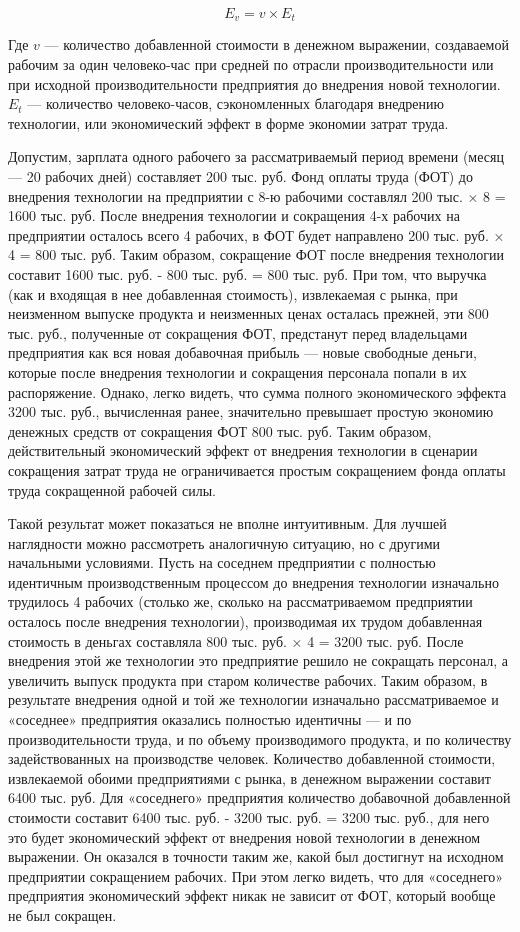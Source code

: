 \documentclass{article}
\begin{document}
$$E_v = v \times E_t$$

Где $v$ — количество добавленной стоимости в денежном выражении, создаваемой рабочим за один человеко-час при средней по отрасли производительности или при исходной производительности предприятия до внедрения новой технологии. $E_t$ — количество человеко-часов, сэкономленных благодаря внедрению технологии, или экономический эффект в форме экономии затрат труда.

Допустим, зарплата одного рабочего за рассматриваемый период времени (месяц — 20 рабочих дней) составляет 200 тыс. руб. Фонд оплаты труда (ФОТ) до внедрения технологии на предприятии с 8-ю рабочими составлял 200 тыс. × 8 = 1600 тыс. руб. После внедрения технологии и сокращения 4-х рабочих на предприятии осталось всего 4 рабочих, в ФОТ будет направлено 200 тыс. руб. × 4 = 800 тыс. руб. Таким образом, сокращение ФОТ после внедрения технологии составит 1600 тыс. руб. - 800 тыс. руб. = 800 тыс. руб. При том, что выручка (как и входящая в нее добавленная стоимость), извлекаемая с рынка, при неизменном выпуске продукта и неизменных ценах осталась прежней, эти 800 тыс. руб., полученные от сокращения ФОТ, предстанут перед владельцами предприятия как вся новая добавочная прибыль — новые свободные деньги, которые после внедрения технологии и сокращения персонала попали в их распоряжение. Однако, легко видеть, что сумма полного экономического эффекта 3200 тыс. руб., вычисленная ранее, значительно превышает простую экономию денежных средств от сокращения ФОТ 800 тыс. руб. Таким образом, действительный экономический эффект от внедрения технологии в сценарии сокращения затрат труда не ограничивается простым сокращением фонда оплаты труда сокращенной рабочей силы.

Такой результат может показаться не вполне интуитивным. Для лучшей наглядности можно рассмотреть аналогичную ситуацию, но с другими начальными условиями. Пусть на соседнем предприятии с полностью идентичным производственным процессом до внедрения технологии изначально трудилось 4 рабочих (столько же, сколько на рассматриваемом предприятии осталось после внедрения технологии), производимая их трудом добавленная стоимость в деньгах составляла 800 тыс. руб. × 4 = 3200 тыс. руб. После внедрения этой же технологии это предприятие решило не сокращать персонал, а увеличить выпуск продукта при старом количестве рабочих. Таким образом, в результате внедрения одной и той же технологии изначально рассматриваемое и «соседнее» предприятия оказались полностью идентичны — и по производительности труда, и по объему производимого продукта, и по количеству задействованных на производстве человек. Количество добавленной стоимости, извлекаемой обоими предприятиями с рынка, в денежном выражении составит 6400 тыс. руб. Для «соседнего» предприятия количество добавочной добавленной стоимости составит 6400 тыс. руб. - 3200 тыс. руб. = 3200 тыс. руб., для него это будет экономический эффект от внедрения новой технологии в денежном выражении. Он оказался в точности таким же, какой был достигнут на исходном предприятии сокращением рабочих. При этом легко видеть, что для «соседнего» предприятия экономический эффект никак не зависит от ФОТ, который вообще не был сокращен.
\end{document}
